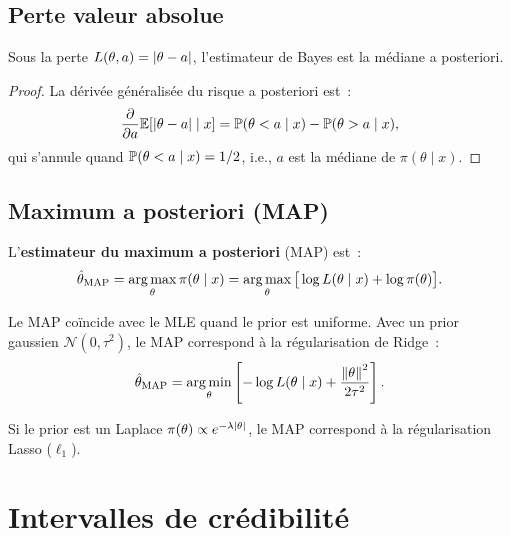 \subsection{Perte valeur absolue}

\begin{theoreme}
Sous la perte $L(\theta, a) = \left| \theta - a \right|$, l'estimateur de Bayes
est la m\'ediane a posteriori.
\end{theoreme}

\begin{proof}
La d\'eriv\'ee g\'en\'eralis\'ee du risque a posteriori est~:
\[
  \frac{\partial}{\partial a} \mathbb{E}[\left| \theta - a \right| \mid x]
  = \mathbb{P}(\theta < a \mid x) - \mathbb{P}(\theta > a \mid x),
\]
qui s'annule quand $\mathbb{P}(\theta < a \mid x) = 1/2$, i.e., $a$ est la
m\'ediane de $\pi(\theta \mid x)$.
\end{proof}

\subsection{Maximum a posteriori (MAP)}

\begin{definition}
L'\textbf{estimateur du maximum a posteriori} (MAP) est~:
\[
  \hat{\theta}_{\text{MAP}} = \operatorname*{arg\,max}_\theta \pi(\theta \mid x)
  = \operatorname*{arg\,max}_\theta \big[\log L(\theta \mid x) + \log \pi(\theta)\big].
\]
\end{definition}

\begin{remarque}
Le MAP co\"incide avec le MLE quand le prior est uniforme. Avec un
prior gaussien $\mathcal{N}(0, \tau^2)$, le MAP correspond \`a la
r\'egularisation de Ridge~:
\[
  \hat{\theta}_{\text{MAP}} = \operatorname*{arg\,min}_\theta \left[
  -\log L(\theta \mid x) + \frac{\left\| \theta \right\|^2}{2\tau^2}\right].
\]
\end{remarque}

\begin{proposition}
Si le prior est un Laplace $\pi(\theta) \propto e^{-\lambda \left| \theta \right|}$,
le MAP correspond \`a la r\'egularisation Lasso ($\ell_1$).
\end{proposition}

\section{Intervalles de cr\'edibilit\'e}

